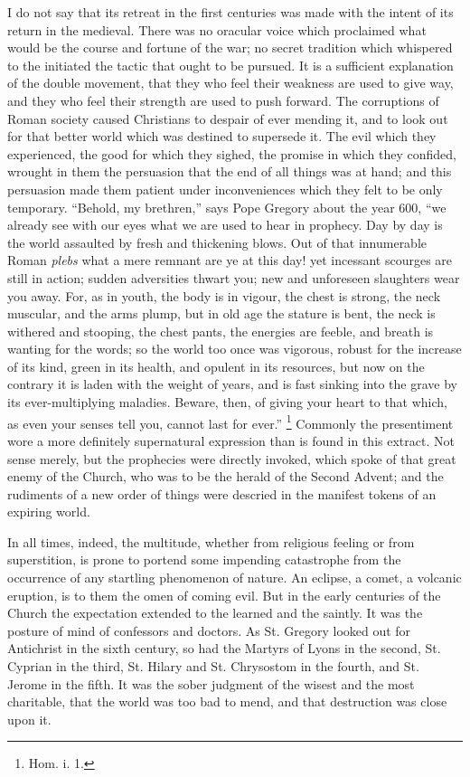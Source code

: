 I do not say that its retreat in the first centuries was made with
the intent of its return in the medieval. There was no oracular voice
which proclaimed what would be the course and fortune of the war; no
secret tradition which whispered to the initiated the tactic that
ought to be pursued. It is a sufficient explanation of the double
movement, that they who feel their weakness are used to give way, and
they who feel their strength are used to push forward. The corruptions
of Roman society caused Christians to despair of ever mending it, and
to look out for that better world which was destined to supersede it.
The evil which they experienced, the good for which they sighed, the
promise in which they confided, wrought in them the persuasion that
the end of all things was at hand; and this persuasion made them
patient under inconveniences which they felt to be only temporary.
``Behold, my brethren,'' says Pope Gregory about the year 600,
``we already see with our eyes what we are used to hear in
prophecy. Day by day is the world assaulted by fresh and thickening
blows. Out of that innumerable Roman \emph{plebs} what a mere remnant
are ye at this day! yet incessant scourges are still in action; sudden
adversities thwart you; new and unforeseen slaughters wear you away.
For, as in youth, the body is in vigour, the chest is strong,
the neck muscular, and the arms plump, but in old age the stature is
bent, the neck is withered and stooping, the chest pants, the energies
are feeble, and breath is wanting for the words; so the world too once
was vigorous, robust for the increase of its kind, green in its
health, and opulent in its resources, but now on the contrary it is
laden with the weight of years, and is fast sinking into the grave by
its ever-multiplying maladies. Beware, then, of giving your heart to
that which, as even your senses tell you, cannot last for ever.'' \footnote{Hom. i. 1.} Commonly the presentiment wore a more definitely supernatural
expression than is found in this extract. Not sense merely, but the
prophecies were directly invoked, which spoke of that great enemy of
the Church, who was to be the herald of the Second Advent; and the
rudiments of a new order of things were descried in the manifest
tokens of an expiring world.

In all times, indeed, the multitude, whether from religious feeling
or from superstition, is prone to portend some impending catastrophe
from the occurrence of any startling phenomenon of nature. An eclipse,
a comet, a volcanic eruption, is to them the omen of coming evil. But
in the early centuries of the Church the expectation extended to the
learned and the saintly. It was the posture of mind of confessors and
doctors. As St. Gregory looked out for Antichrist in the sixth
century, so had the Martyrs of Lyons in the second, St. Cyprian in the
third, St. Hilary and St. Chrysostom in the fourth, and St. Jerome in
the fifth. It was the sober judgment of the wisest and the most
charitable, that the world was too bad to mend, and that destruction
was close upon it.

